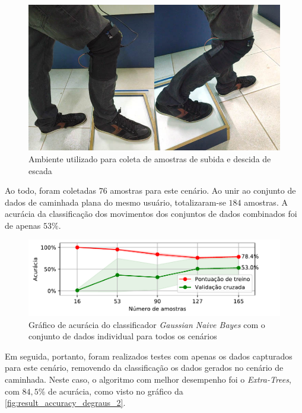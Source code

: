 \begin{figure}[ht]
	\caption{\label{fig:result_poses_degraus}Ambiente utilizado para coleta de amostras de subida e descida de escada}
	\begin{center}
	    \includegraphics[width=.8\textwidth]{resources/result_poses_degraus}
	\end{center}
\end{figure}

Ao todo, foram coletadas \(76\) amostras para este cenário. Ao unir ao conjunto de dados de caminhada plana do mesmo usuário, totalizaram-se \(184\) amostras. A acurácia da classificação dos movimentos dos conjuntos de dados combinados foi de apenas \(53\%\).

\begin{figure}[H]
	\caption{\label{fig:result_accuracy_degraus_1}Gráfico de acurácia do classificador \textit{Gaussian Naive Bayes} com o conjunto de dados individual para todos os cenários}
	\begin{center}
	    \includegraphics[width=\textwidth]{resources/result_accuracy_degraus_1}
	\end{center}
\end{figure}
\newpage
Em seguida, portanto, foram realizados testes com apenas os dados capturados para este cenário, removendo da classificação os dados gerados no cenário de caminhada. Neste caso, o algoritmo com melhor desempenho foi o \textit{Extra-Trees}, com \(84{,}5\%\) de acurácia, como visto no gráfico da \autoref{fig:result_accuracy_degraus_2}.


